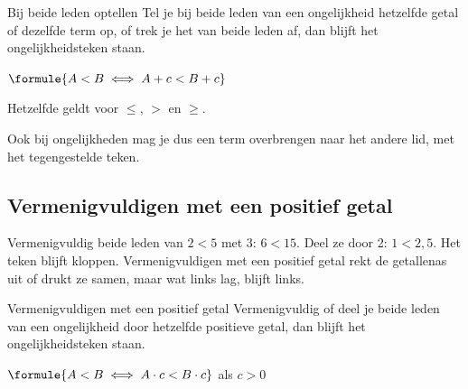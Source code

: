 \begin{theorie}
\begin{stelling}{Bij beide leden optellen}
Tel je bij beide leden van een ongelijkheid hetzelfde getal of dezelfde term op, of trek je het van beide leden af, dan blijft het ongelijkheidsteken staan.

\vspace{1mm}
\qquad $\formule{A < B \iff A + c < B + c}$
\end{stelling}
Hetzelfde geldt voor $\leqslant$, $>$ en $\geqslant$.
\end{theorie}

Ook bij ongelijkheden mag je dus een term overbrengen naar het andere lid, met het tegengestelde teken.


\subsection{Vermenigvuldigen met een positief getal}

Vermenigvuldig beide leden van $2 < 5$ met 3: $6 < 15$. Deel ze door 2: $1 < 2{,}5$. Het teken blijft kloppen. Vermenigvuldigen met een positief getal rekt de getallenas uit of drukt ze samen, maar wat links lag, blijft links.

\begin{theorie}
\begin{stelling}{Vermenigvuldigen met een positief getal}
Vermenigvuldig of deel je beide leden van een ongelijkheid door hetzelfde positieve getal, dan blijft het ongelijkheidsteken staan.

\vspace{1mm}
\qquad $\formule{A < B \iff A \cdot c < B \cdot c}$ \qquad als $c > 0$
\end{stelling}
\end{theorie}


